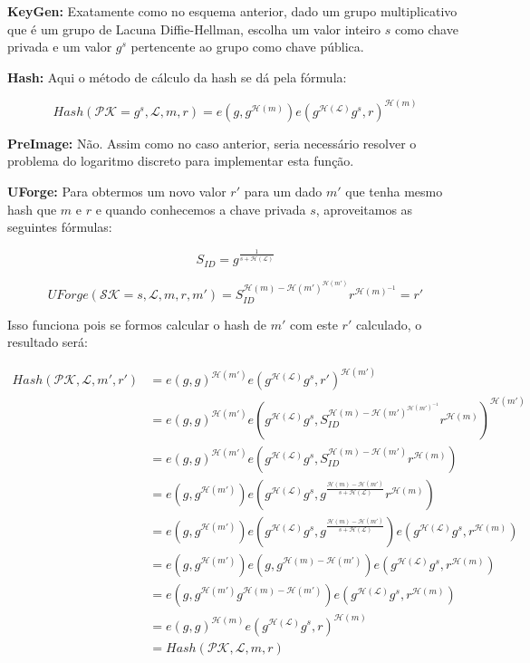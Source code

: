 \documentclass[a4paper]{article}
\begin{document}
\textbf{KeyGen: }Exatamente como no esquema anterior, dado um grupo
multiplicativo que é um grupo de Lacuna Diffie-Hellman, escolha um
valor inteiro $s$ como chave privada e um valor $g^s$ pertencente ao
grupo como chave pública.

\textbf{Hash: } Aqui o método de cálculo da hash se dá pela fórmula:

$$
Hash(\mathcal{PK}=g^s, \mathcal{L}, m, r) = e(g, g^{\mathcal{H}(m)})e(g^{\mathcal{H}(\mathcal{L})}g^s, r)^{\mathcal{H}(m)}
$$

\textbf{PreImage:} Não. Assim como no caso anterior, seria
necessário resolver o problema do logaritmo discreto para implementar
esta função.

\textbf{UForge:} Para obtermos um novo valor $r'$ para um dado $m'$
que tenha mesmo hash que $m$ e $r$ e quando conhecemos a chave privada
$s$, aproveitamos as seguintes fórmulas:

$$
S_{ID} = g^{\frac{1}{s+\mathcal{H}(\mathcal{L})}}
$$

$$
UForge(\mathcal{SK}=s, \mathcal{L}, m, r, m') = S_{ID}^{\mathcal{H}(m)-\mathcal{H}(m')^{\mathcal{H}(m')}}r^{\mathcal{H}(m)^{-1}} = r'
$$

Isso funciona pois se formos calcular o hash de $m'$ com este $r'$
calculado, o resultado será:

\begin{equation}
\begin{split}
  Hash(\mathcal{PK},\mathcal{L}, m', r') &= e(g, g)^{\mathcal{H}(m')}e(g^{\mathcal{H}(\mathcal{L})}g^s, r')^{\mathcal{H}(m')}\\
  &= e(g, g)^{\mathcal{H}(m')}e(g^{\mathcal{H}(\mathcal{L})}g^s, S_{ID}^{\mathcal{H}(m)-\mathcal{H}(m')^{\mathcal{H}(m')^{-1}}}r^{\mathcal{H}(m)})^{\mathcal{H}(m')}\\
  &= e(g, g)^{\mathcal{H}(m')}e(g^{\mathcal{H}(\mathcal{L})}g^s, S_{ID}^{\mathcal{H}(m)-\mathcal{H}(m')}r^{\mathcal{H}(m)})\\
  &= e(g, g^{\mathcal{H}(m')})e(g^{\mathcal{H}(\mathcal{L})}g^s, g^{\frac{\mathcal{H}(m)-\mathcal{H}(m')}{s+\mathcal{H}(\mathcal{L})}}r^{\mathcal{H}(m)})\\
&= e(g, g^{\mathcal{H}(m')})e(g^{\mathcal{H}(\mathcal{L})}g^s, g^{\frac{\mathcal{H}(m)-\mathcal{H}(m')}{s+\mathcal{H}(\mathcal{L})}})e(g^{\mathcal{H}(\mathcal{L})}g^s, r^{\mathcal{H}(m)})\\
  &= e(g, g^{\mathcal{H}(m')})e(g, g^{\mathcal{H}(m)-\mathcal{H}(m')})e(g^{\mathcal{H}(\mathcal{L})}g^s, r^{\mathcal{H}(m)})\\
  &= e(g, g^{\mathcal{H}(m')}g^{\mathcal{H}(m)-\mathcal{H}(m')})e(g^{\mathcal{H}(\mathcal{L})}g^s, r^{\mathcal{H}(m)})\\
  &= e(g, g)^{\mathcal{H}(m)}e(g^{\mathcal{H}(\mathcal{L})}g^s, r)^{\mathcal{H}(m)}\\
&= Hash(\mathcal{PK},\mathcal{L}, m, r)
\end{split}
\end{equation}
\end{document}
